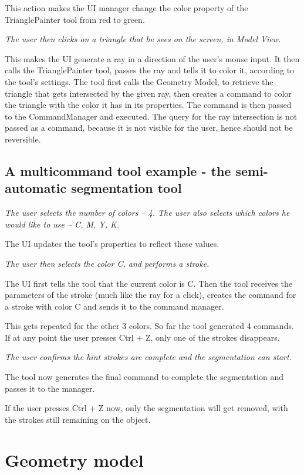 This action makes the UI manager change the color property of the TrianglePainter tool from red to green.

\textit{The user then clicks on a triangle that he sees on the screen, in Model View.}

This makes the UI generate a ray in a direction of the user's mouse input. It then calls the TrianglePainter tool, passes the ray and tells it to color it, according to the tool's settings. The tool first calls the Geometry Model, to retrieve the triangle that gets intersected by the given ray, then creates a command to color the triangle with the color it has in its properties. The command is then passed to the CommandManager and executed. The query for the ray intersection is not passed as a command, because it is not visible for the user, hence should not be reversible.

\subsection{A multicommand tool example - the semi-automatic segmentation tool}
\textit{The user selects the number of colors -- 4. The user also selects which colors he would like to use -- C, M, Y, K.}

The UI updates the tool's properties to reflect these values.

\textit{The user then selects the color C, and performs a stroke.}

The UI first tells the tool that the current color is C. Then the tool receives the parameters of the stroke (much like the ray for a click), creates the command for a stroke with color C and sends it to the command manager.

This gets repeated for the other 3 colors. So far the tool generated 4 commands. If at any point the user presses Ctrl + Z, only one of the strokes disappears.

\textit{The user confirms the hint strokes are complete and the segmentation can start.}

The tool now generates the final command to complete the segmentation and passes it to the manager.


If the user presses Ctrl + Z now, only the segmentation will get removed, with the strokes still remaining on the object.

\section{Geometry model}

